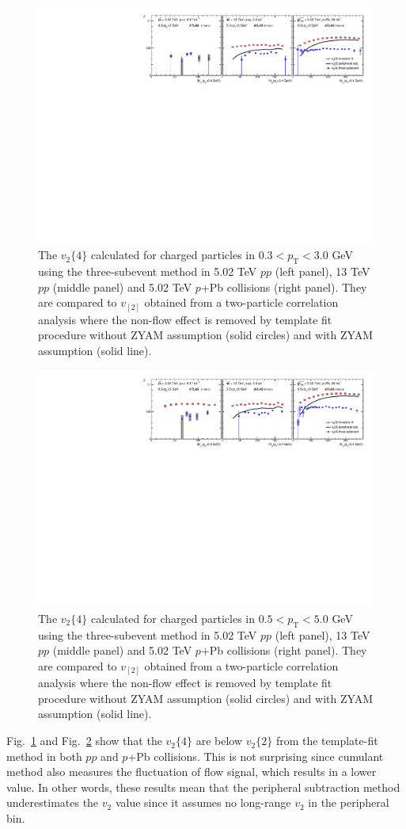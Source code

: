 \begin{figure}[H]
\centering
\includegraphics[width=0.8\linewidth]{figs/sec_result/phy_comp_pt0.pdf}
\caption{The $v_{2}\{4\}$ calculated for charged particles in $0.3<p_{\text{T}}<3.0$ GeV using the three-subevent method in 5.02 TeV $pp$ (left panel), 13 TeV $pp$ (middle panel) and 5.02 TeV $p$+Pb collisions (right panel). They are compared to $v_[2]$ obtained from a two-particle correlation analysis where the non-flow effect is removed by template fit procedure without ZYAM assumption (solid circles) and with ZYAM assumption (solid line).}
\label{fig:phy_comp_pt0}
\end{figure}
\begin{figure}[H]
\centering
\includegraphics[width=0.8\linewidth]{figs/sec_result/phy_comp_pt1.pdf}
\caption{The $v_{2}\{4\}$ calculated for charged particles in $0.5<p_{\text{T}}<5.0$ GeV using the three-subevent method in 5.02 TeV $pp$ (left panel), 13 TeV $pp$ (middle panel) and 5.02 TeV $p$+Pb collisions (right panel). They are compared to $v_[2]$ obtained from a two-particle correlation analysis where the non-flow effect is removed by template fit procedure without ZYAM assumption (solid circles) and with ZYAM assumption (solid line).}
\label{fig:phy_comp_pt1}
\end{figure}
Fig.~\ref{fig:phy_comp_pt0} and Fig.~\ref{fig:phy_comp_pt1} show that the $v_{2}\{4\}$ are below $v_{2}\{2\}$ from the template-fit method in both $pp$ and $p$+Pb collisions. This is not surprising since cumulant method also measures the fluctuation of flow signal, which results in a lower value. In other words, these results mean that the peripheral subtraction method underestimates the $v_{2}$ value since it assumes no long-range $v_{2}$ in the peripheral bin.



